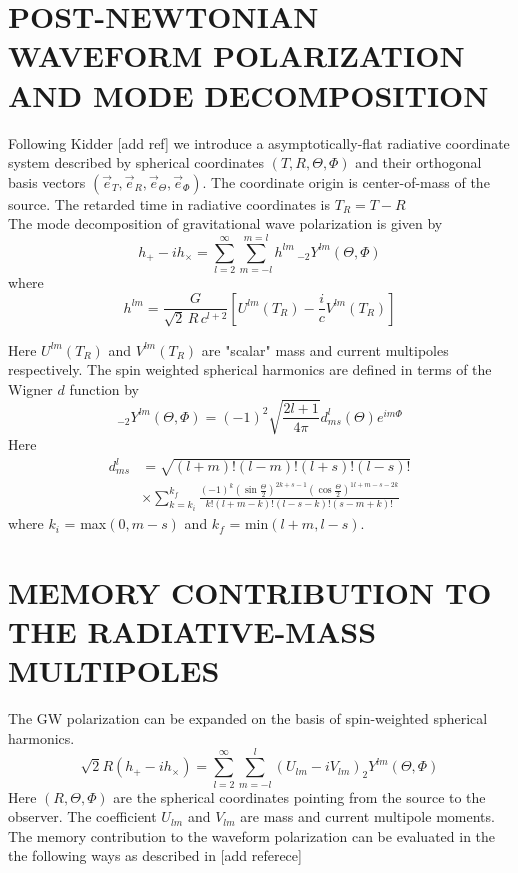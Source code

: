 \documentclass[prd,preprintnumbers,twocolumn,eqsecnum,floatfix,letter]{revtex4}
\begin{document}
\section{POST-NEWTONIAN WAVEFORM POLARIZATION AND MODE DECOMPOSITION}
Following Kidder [add ref] we introduce a asymptotically-flat radiative coordinate system described by spherical coordinates $(T, R, \Theta, \Phi)$ and their orthogonal basis vectors $(\vec{e}_T, \vec{e}_R, \vec{e}_{\Theta}, \vec{e}_{\Phi})$. The coordinate origin is center-of-mass of the source. The retarded time in radiative coordinates is $T_R = T - R$
\\
The mode decomposition of gravitational wave polarization is given by
\begin{equation}
	h_+ - \mathit{i}h_{\times} = \sum_{l=2}^{\infty}\sum_{m=-l}^{m=l}h^{lm} \,  _{-2}Y^{lm}(\Theta, \Phi)
\end{equation}
where
\begin{equation}
	h^{lm}= \frac{G}{\sqrt{2}\, R \, c^{l+2}}\left[U^{lm}(T_R)-\frac{\mathit{i}}{c}V^{lm}(T_R)\right]
\end{equation}

Here $U^{lm}(T_R)$ and $V^{lm}(T_R)$ are "scalar" mass and current multipoles respectively. The spin weighted spherical harmonics are defined in terms of the Wigner $d$ function by
\begin{equation}
	_{-2}Y^{lm}(\Theta, \Phi) = (-1)^2\sqrt{\frac{2l + 1}{4\pi}}d^{l}_{ms}(\Theta)e^{\mathit{i}m\Phi}
\end{equation} 
Here
\begin{align}
	d^{l}_{ms}&=\sqrt{(l+m)!(l-m)!(l+s)!(l-s)!}\\
	&\times \sum_{k=k_i}^{k_f}\frac{(-1)^k(\sin\frac{\Theta}{2})^{2k+s-1}(\cos\frac{\Theta}{2})^{1l+m-s-2k}}{k!(l+m-k)!(l-s-k)!(s-m+k)!}
\end{align}
where $k_i$ = max$(0, m-s)$ and $k_f$ = min$(l+m, l-s)$. 

\section{MEMORY CONTRIBUTION TO THE RADIATIVE-MASS MULTIPOLES}
The GW polarization can be expanded on the basis of spin-weighted spherical harmonics.
\begin{equation}
	\sqrt{2}R(h_{+} - ih_{\times}) = \sum_{l=2}^{\infty}\sum_{m=-l}^{l}(U_{lm} - \mathit{i}V_{lm})_2Y^{lm}(\Theta, \Phi)
\end{equation}
Here $(R,\Theta,\Phi)$ are the spherical coordinates pointing from the source to the observer. The coefficient $U_{lm}$ and $V_{lm}$ are mass and current multipole moments. \\
The memory contribution to the waveform polarization can be evaluated in the the following ways as described in [add referece]
 
\end{document}
